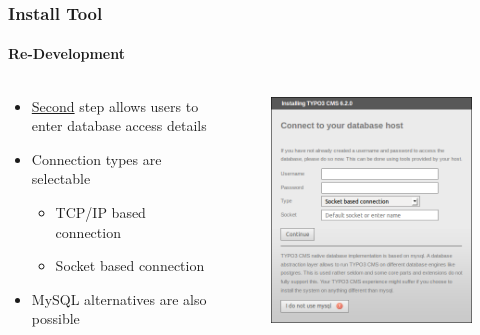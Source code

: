 
\begin{frame}[fragile]
	\frametitle{Install Tool}
	\framesubtitle{Re-Development}

	\begin{columns}[T]

		\begin{column}{.5\textwidth}
			\begin{itemize}
				\item \underline{Second} step allows users to enter database access details
				\item Connection types are selectable
					\begin{itemize}
						\item TCP/IP based connection
						\item Socket based connection
					\end{itemize}
				\item MySQL alternatives are also possible
			\end{itemize}
		\end{column}

		\begin{column}{.5\textwidth}
			\begin{figure}\vspace*{-0.4cm}
				\includegraphics[width=0.8\linewidth]{Images/InstallTool/DatabaseConnectionDetails.png}
			\end{figure}
		\end{column}

	\end{columns}

\end{frame}

